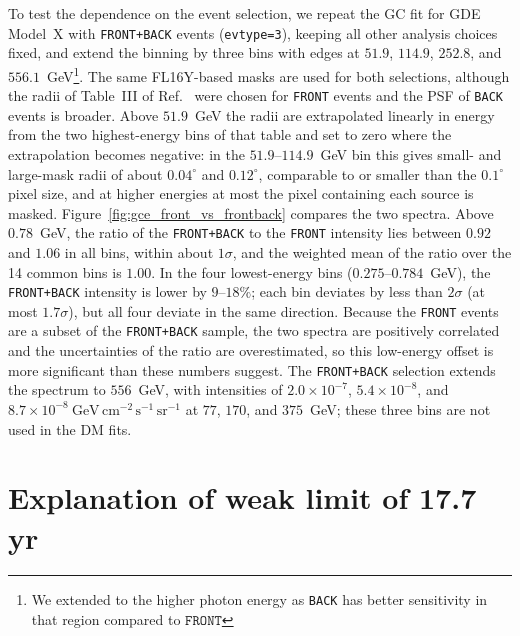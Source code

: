 \documentclass[superscriptaddress,
showpacs,preprintnumbers,nofootinbib,eqsecnum,amsmath,amssymb,aps,11pt, groupedaddress, floatfix]{revtex4-2}
\begin{document}
To test the dependence on the event selection, we repeat the GC fit for GDE Model~X with \texttt{FRONT+BACK} events (\texttt{evtype=3}), keeping all other analysis choices fixed, and extend the binning by three bins with edges at $51.9$, $114.9$, $252.8$, and $556.1$~GeV\footnote{We extended to the higher photon energy as \texttt{BACK} has better sensitivity in that region compared to $\texttt{FRONT}$}. The same FL16Y-based masks are used for both selections, although the radii of Table~III of Ref.~\cite{Cholis:2021rpp} were chosen for \texttt{FRONT} events and the PSF of \texttt{BACK} events is broader. Above $51.9$~GeV the radii are extrapolated linearly in energy from the two highest-energy bins of that table and set to zero where the extrapolation becomes negative: in the $51.9$--$114.9$~GeV bin this gives small- and large-mask radii of about $0.04^\circ$ and $0.12^\circ$, comparable to or smaller than the $0.1^\circ$ pixel size, and at higher energies at most the pixel containing each source is masked. Figure~\ref{fig:gce_front_vs_frontback} compares the two spectra. Above $0.78$~GeV, the ratio of the \texttt{FRONT+BACK} to the \texttt{FRONT} intensity lies between $0.92$ and $1.06$ in all bins, within about $1\sigma$, and the weighted mean of the ratio over the 14 common bins is $1.00$. In the four lowest-energy bins ($0.275$--$0.784$~GeV), the \texttt{FRONT+BACK} intensity is lower by $9$--$18\%$; each bin deviates by less than $2\sigma$ (at most $1.7\sigma$), but all four deviate in the same direction. Because the \texttt{FRONT} events are a subset of the \texttt{FRONT+BACK} sample, the two spectra are positively correlated and the uncertainties of the ratio are overestimated, so this low-energy offset is more significant than these numbers suggest. The \texttt{FRONT+BACK} selection extends the spectrum to $556$~GeV, with intensities of $2.0\times10^{-7}$, $5.4\times10^{-8}$, and $8.7\times10^{-8}~\mathrm{GeV\,cm^{-2}\,s^{-1}\,sr^{-1}}$ at $77$, $170$, and $375$~GeV; these three bins are not used in the DM fits.





\section{Explanation of weak limit of 17.7 yr}\label{app:dSphs_weak}
\end{document}
